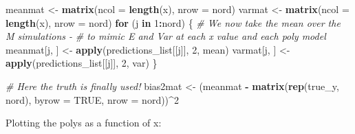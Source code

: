 \documentclass[
]{article}
\newenvironment{Shaded}{\begin{snugshade}}{\end{snugshade}}
\newcommand{\AttributeTok}[1]{\textcolor[rgb]{0.13,0.29,0.53}{#1}}
\newcommand{\CommentTok}[1]{\textcolor[rgb]{0.56,0.35,0.01}{\textit{#1}}}
\newcommand{\ConstantTok}[1]{\textcolor[rgb]{0.56,0.35,0.01}{#1}}
\newcommand{\ControlFlowTok}[1]{\textcolor[rgb]{0.13,0.29,0.53}{\textbf{#1}}}
\newcommand{\DecValTok}[1]{\textcolor[rgb]{0.00,0.00,0.81}{#1}}
\newcommand{\FunctionTok}[1]{\textcolor[rgb]{0.13,0.29,0.53}{\textbf{#1}}}
\newcommand{\NormalTok}[1]{#1}
\newcommand{\OtherTok}[1]{\textcolor[rgb]{0.56,0.35,0.01}{#1}}
\newcommand{\SpecialCharTok}[1]{\textcolor[rgb]{0.81,0.36,0.00}{\textbf{#1}}}
\begin{document}
\begin{Shaded}
\begin{Highlighting}[]
\NormalTok{meanmat }\OtherTok{\textless{}{-}} \FunctionTok{matrix}\NormalTok{(}\AttributeTok{ncol =} \FunctionTok{length}\NormalTok{(x), }\AttributeTok{nrow =}\NormalTok{ nord)}
\NormalTok{varmat }\OtherTok{\textless{}{-}} \FunctionTok{matrix}\NormalTok{(}\AttributeTok{ncol =} \FunctionTok{length}\NormalTok{(x), }\AttributeTok{nrow =}\NormalTok{ nord)}
\ControlFlowTok{for}\NormalTok{ (j }\ControlFlowTok{in} \DecValTok{1}\SpecialCharTok{:}\NormalTok{nord) \{}
  \CommentTok{\# We now take the mean over the M simulations {-}}
  \CommentTok{\# to mimic E and Var at each x value and each poly model}
\NormalTok{  meanmat[j, ] }\OtherTok{\textless{}{-}} \FunctionTok{apply}\NormalTok{(predictions\_list[[j]], }\DecValTok{2}\NormalTok{, mean)}
\NormalTok{  varmat[j, ] }\OtherTok{\textless{}{-}} \FunctionTok{apply}\NormalTok{(predictions\_list[[j]], }\DecValTok{2}\NormalTok{, var)}
\NormalTok{\}}

\CommentTok{\# Here the truth is finally used!}
\NormalTok{bias2mat }\OtherTok{\textless{}{-}}\NormalTok{ (meanmat }\SpecialCharTok{{-}} \FunctionTok{matrix}\NormalTok{(}\FunctionTok{rep}\NormalTok{(true\_y, nord), }\AttributeTok{byrow =} \ConstantTok{TRUE}\NormalTok{, }\AttributeTok{nrow =}\NormalTok{ nord))}\SpecialCharTok{\^{}}\DecValTok{2} 
\end{Highlighting}
\end{Shaded}

Plotting the polys as a function of x:
\end{document}
